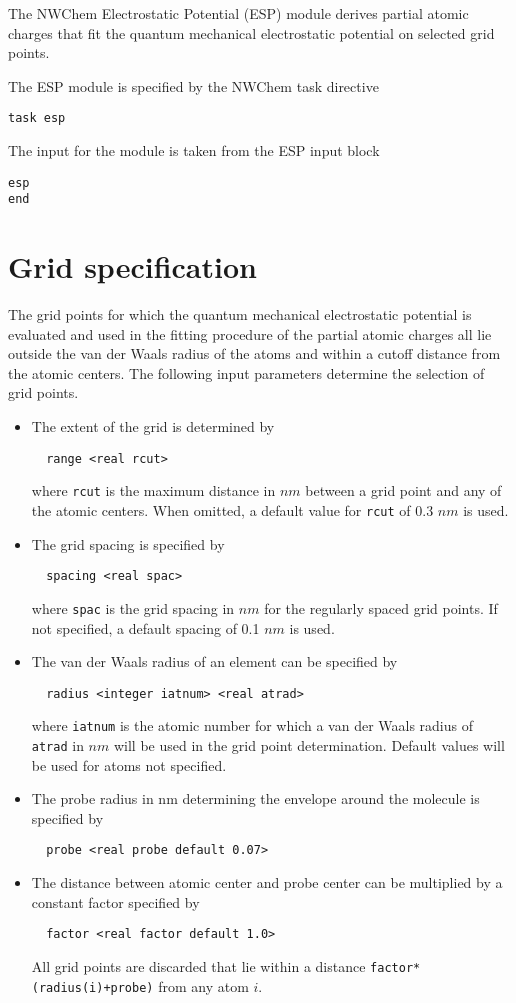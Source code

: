 \label{sec:esp}

The NWChem Electrostatic Potential (ESP) module derives partial atomic 
charges that fit the quantum mechanical electrostatic potential on selected
grid points.

The ESP module is specified by the NWChem task directive
\begin{verbatim}
task esp
\end{verbatim}

The input for the module is taken from the ESP input block
\begin{verbatim}
esp
end
\end{verbatim}

\section{Grid specification}
The grid points for which the quantum mechanical electrostatic potential is 
evaluated and used in the fitting procedure of the partial atomic charges
all lie outside the van der Waals radius of the atoms and within a cutoff
distance from the atomic centers. The following input parameters determine
the selection of grid points.
\begin{itemize}
\item
The extent of the grid is determined by
\begin{verbatim}
  range <real rcut>
\end{verbatim}
where \verb+rcut+ is the maximum distance in $nm$ between a grid point and
any of the atomic centers. When omitted, a default value for \verb+rcut+ of
0.3 $nm$ is used.
\item
The grid spacing is specified by
\begin{verbatim}
  spacing <real spac>
\end{verbatim}
where \verb+spac+ is the grid spacing in $nm$ for the regularly spaced
grid points. If not specified, a default spacing of 0.1 $nm$ is used.
\item
The van der Waals radius of an element can be specified by
\begin{verbatim}
  radius <integer iatnum> <real atrad>
\end{verbatim}
where \verb+iatnum+ is the atomic number for which a van der Waals radius
of \verb+atrad+ in $nm$ will be used in the grid point determination.
Default values will be used for atoms not specified.
\item
The probe radius in nm determining the envelope around the molecule is
specified by
\begin{verbatim}
  probe <real probe default 0.07> 
\end{verbatim}
\item
The distance between atomic center and probe center can be multiplied
by a constant factor specified by
\begin{verbatim}
  factor <real factor default 1.0> 
\end{verbatim}
All grid points are discarded that lie within a distance 
\verb-factor*(radius(i)+probe)- from any atom $i$.
\end{itemize}

